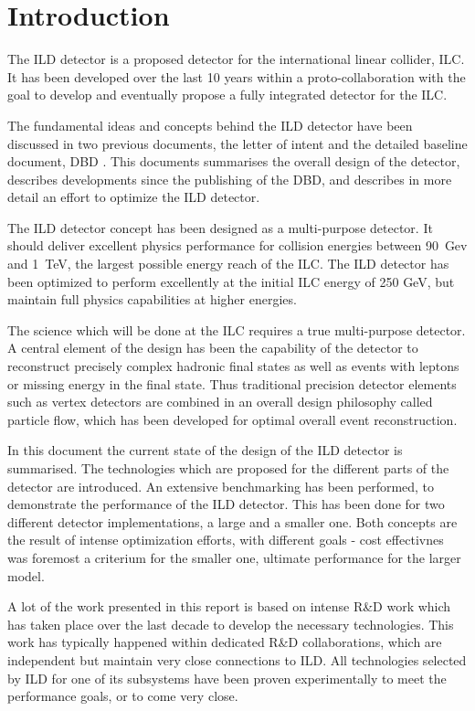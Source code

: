 \chapter{Introduction}
The ILD detector is a proposed detector for the international linear collider, ILC. It has been developed over the last 10 years within a proto-collaboration with the goal to develop and eventually propose a fully integrated detector for the ILC. 

The fundamental ideas and concepts behind the ILD detector have been discussed in two previous documents, the letter of intent \cite{ild:bib:ILDloi} and the detailed baseline document, DBD \cite{ild:bib:ILDDBD}. This documents summarises the overall design of the detector, describes developments since the publishing of the DBD, and describes in more detail an effort to optimize the ILD detector. 

The ILD detector concept has been designed as a multi-purpose detector. It should deliver excellent physics performance for collision energies between 90~Gev and 1~TeV, the largest possible energy reach of the ILC. The ILD detector has been optimized to perform excellently at the initial ILC energy of 250 GeV, but maintain full physics capabilities at higher energies. 

The science which will be done at the ILC requires a true multi-purpose detector. A central element of the design has been the capability of the detector to reconstruct precisely complex hadronic final states as well as events with leptons or missing energy in the final state. Thus traditional precision detector elements such as vertex detectors are combined in an overall design philosophy called particle flow, which has been developed for optimal overall event reconstruction.

In this document the current state of the design of the ILD detector is summarised. The technologies which are proposed for the different parts of the detector are introduced. An extensive benchmarking has been performed, to demonstrate the performance of the ILD detector. This has been done for two different detector implementations, a large and a smaller one. Both concepts are the result of intense optimization efforts, with different goals - cost effectivnes was foremost a criterium for the smaller one, ultimate performance for the larger model. 

A lot of the work presented in this report is based on intense R\&D work which has taken place over the last decade to develop the necessary technologies. 
This work has typically happened within dedicated R\&D collaborations, which are independent but maintain very close connections to ILD. All technologies selected by ILD for one of its subsystems have been proven experimentally to meet the performance goals, or to come very close. 

